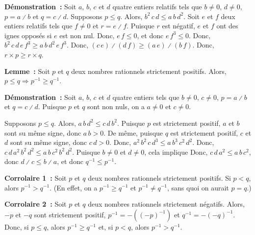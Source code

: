 \medskip

\noindent\textbf{Démonstration :}
    Soit $a$, $b$, $c$ et $d$ quatre entiers relatifs tels que $b \neq 0$, $d \neq 0$, $p = a \divslash b$ et $q = c \divslash d$.
    Supposons $p \leq q$.
    Alors, $b^2 \, c \, d \leq a \, b \, d^2$.
    Soit $e$ et $f$ deux entiers relatifs tels que $f \neq 0$ et $r = e \divslash f$.
    Puisque $r$ est négatif, $e$ et $f$ ont des ignes opposés si $e$ est non nul. 
    Donc, $e \, f \leq 0$, et donc $e \, f^3 \leq 0$.
    Donc, $b^2 \, c \, d \, e \, f^3 \geq a \, b \, d^2 \, e \, f^3$. 
    Donc, $(c \, e) \divslash (d \, f) \geq (a \, e) \divslash (b \, f)$. 
    Donc, $r \times p \geq r \times q$.

    \done

\medskip

\noindent\textbf{Lemme :} Soit $p$ et $q$ deux nombres rationnels strictement positifs. 
    Alors, $p \leq q \Rightarrow p^{-1} \geq q^{-1}$.

\medskip

\noindent\textbf{Démonstration :} 
    Soit $a$, $b$, $c$ et $d$ quatre entiers tels que $b \neq 0$, $c \neq 0$, $p = a \divslash b$ et $q = c \divslash d$.
    Puisque $p$ et $q$ sont non nuls, on a $a \neq 0$ et $c \neq 0$.
    
    Supposons $p \leq q$.
    Alors, $a \, b \, d^2 \leq c \, d \, b^2$.
    Puisque $p$ est strictement positif, $a$ et $b$ sont su même signe, donc $a \, b > 0$.
    De même, puisque $q$ est strictement positif, $c$ et $d$ sont su même signe, donc $c \, d > 0$.
    Donc, $a^2 \, b^2 \, c \, d^3 \leq a \, b^3 \, c^2 \, d^2$.
    Donc, $c \, d \, a^2 \, b^2 \, d^2 \leq a \, b \, c^2 \, b^2 \, d^2$.
    Puisque $b \neq 0$ et $d \neq 0$, cela implique
    Donc, $c \, d \, a^2 \leq a \, b \, c^2$, donc $d \divslash c \leq b \divslash a$, et donc $q^{-1} \leq p^{-1}$.

    \done

\medskip

\noindent\textbf{Corrolaire 1 :} Soit $p$ et $q$ deux nombres rationnels strictement positifs. 
    Si $p < q$, alors $p^{-1} > q^{-1}$. 
    (En effet, on a $p^{-1} \geq q^{-1}$ et $p^{-1} \neq q^{-1}$, sans quoi on aurait $p = q$.)

\medskip

\noindent\textbf{Corrolaire 2 :} Soit $p$ et $q$ deux nombres rationnels strictement négatifs. 
    Alors, $-p$ et $-q$ sont strictement positif, $p^{-1} = -((-p)^{-1})$ et $q^{-1} = -(-q)^{-1}$.
    Donc, si $p \leq q$, alors $p^{-1} \geq q^{-1}$ et, si $p < q$, alors $p^{-1} > q^{-1}$. 

